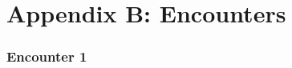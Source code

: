 \documentclass[module]{subfiles}
\newcommand{\inittracker}{
	\begin{dndtable}[lXlX]\multicolumn{4}{c}{\textbf{Initiative Tracker}}\\
		30 & & 15 &\\ 29 & & 14 &\\ 28 & & 13 &\\ 27 & & 12 &\\ 26 & & 11 &\\
		25 & & 10 &\\ 24 & & 9 &\\ 23 & & 8 &\\ 22 & & 7 &\\ 21 & & 6 &\\
		20 & & 5 &\\ 19 & & 4 &\\ 18 & & 3 &\\ 17 & & 2 &\\ 16 & & 1 &
	\end{dndtable}}
\begin{document}
\selectfont
\clearpage

\chapter{Appendix B: Encounters}

\begin{comment}

\subsection{Encounter }
\begin{monsterbox}{}
	\textit{}\\
	\hline
	\basics[
		armorclass 	= {},
		hitpoints 	= \dice{},
		speed 		= {30~ft.}]
	\hline
	\stats[
		STR = \stat{},
		DEX = \stat{},
		CON = \stat{},
		INT = \stat{},
		WIS = \stat{},
		CHA = \stat{}]
	\hline
	\details[
		senses = {passive Perception },
		languages = {},
		challenge = { ( XP)}]
	\hline \\[1mm]
	\begin{monsteraction}[]
	
	\end{monsteraction}
	
	\monstersection{Actions}
	\begin{monsteraction}[]
		\textit{Melee Weapon Attack:}
	\end{monsteraction}
\end{monsterbox}
~\\
Monster 1 ( HP):\\~\\
\vfill
\pagebreak
\inittracker

\end{comment}

\subsection{Encounter 1}
\end{document}
